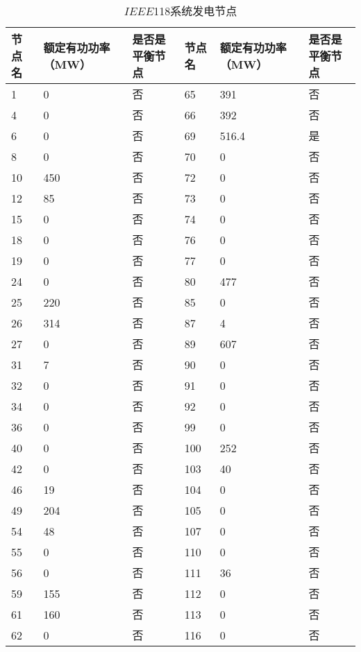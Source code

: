 \begin{table}[H]
\centering
\caption{$IEEE$118系统发电节点}
\label{tab:chap5:generator118}
\begin{tabular}{C{1.4cm}C{2.4cm}C{2.2cm}C{1.4cm}C{2.4cm}C{2.2cm}}
\toprule
\textbf{节点名} & \textbf{额定有功功率（MW）} & \textbf{ 是否是平衡节点 } & \textbf{节点名} & \textbf{额定有功功率（MW）}  & \textbf{ 是否是平衡节点 } \\
   & 0          & 否       & 65  & 391        & 否       \\
4   & 0          & 否       & 66  & 392        & 否       \\
6   & 0          & 否       & 69  & 516.4      & 是       \\
8   & 0          & 否       & 70  & 0          & 否       \\
10  & 450        & 否       & 72  & 0          & 否       \\
12  & 85         & 否       & 73  & 0          & 否       \\
15  & 0          & 否       & 74  & 0          & 否       \\
18  & 0          & 否       & 76  & 0          & 否       \\
19  & 0          & 否       & 77  & 0          & 否       \\
24  & 0          & 否       & 80  & 477        & 否       \\
25  & 220        & 否       & 85  & 0          & 否       \\
26  & 314        & 否       & 87  & 4          & 否       \\
27  & 0          & 否       & 89  & 607        & 否       \\
31  & 7          & 否       & 90  & 0          & 否       \\
32  & 0          & 否       & 91  & 0          & 否       \\
34  & 0          & 否       & 92  & 0          & 否       \\
36  & 0          & 否       & 99  & 0          & 否       \\
40  & 0          & 否       & 100 & 252        & 否       \\
42  & 0          & 否       & 103 & 40         & 否       \\
46  & 19         & 否       & 104 & 0          & 否       \\
49  & 204        & 否       & 105 & 0          & 否       \\
54  & 48         & 否       & 107 & 0          & 否       \\
55  & 0          & 否       & 110 & 0          & 否       \\
56  & 0          & 否       & 111 & 36         & 否       \\
59  & 155        & 否       & 112 & 0          & 否       \\
61  & 160        & 否       & 113 & 0          & 否       \\
62  & 0          & 否       & 116 & 0          & 否     \\
\bottomrule
\end{tabular}
\end{table}

